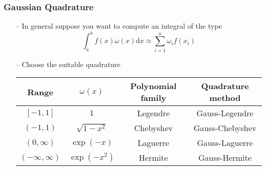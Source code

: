 \documentclass[aspectratio=169, 11pt]{beamer}
\begin{document}
\begin{frame}
\frametitle{Gaussian Quadrature}
  \begin{itemize}
    \item[--] In general suppose you want to compute an integral of the type
    \[
      \int_{a}^{b}f\left(x\right)\omega\left(x\right)\mathrm{d}x\approx\sum_{i=1}^{n}\omega_{i}f\left(x_{i}\right)
    \]
    \bigskip
    \item[--] Choose the suitable quadrature

    \begin{table}
      \centering
      \begin{tabular}{cccc}
        \hline
        Range & $\omega\left(x\right)$ & Polynomial family  & Quadrature method\tabularnewline
        \hline
        $\left[-1,1\right]$ & $1$ & Legendre & Gauss-Legendre\tabularnewline
        $\left(-1,1\right)$ & $\sqrt{1-x^{2}}$ & Chebyshev & Gauss-Chebyshev\tabularnewline
        $\left(0,\infty\right)$ & $\exp\left(-x\right)$ & Laguerre & Gauss-Laguerre\tabularnewline
        $\left(-\infty,\infty\right)$ & $\exp\left(-x^{2}\right)$ & Hermite & Gauss-Hermite\tabularnewline
        \hline
      \end{tabular}
    \end{table}
  \end{itemize}
\end{frame}
\end{document}
